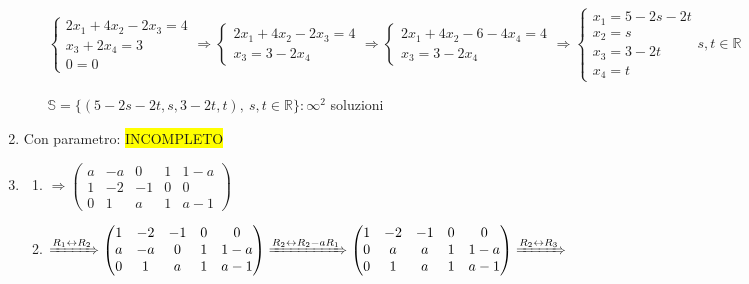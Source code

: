 \documentclass{article}
\newcommand{\hl}[1]{\colorbox{yellow}{#1}}
\newcommand{\R}{\mathbb{R}}
\begin{document}
\begin{enumerate}
\begin{enumerate}
		            $\begin{cases}
				            2x_1+4x_2-2x_3=4 \\
				            x_3+2x_4=3       \\
				            0=0
			            \end{cases}\Rightarrow
			            \begin{cases}
				            2x_1+4x_2-2x_3=4 \\
				            x_3=3-2x_4
			            \end{cases}\Rightarrow
			            \begin{cases}
				            2x_1+4x_2-6-4x_4=4 \\
				            x_3=3-2x_4
			            \end{cases}\Rightarrow
			            \begin{cases}
				            x_1=5-2s-2t \\
				            x_2=s       \\
				            x_3=3-2t    \\
				            x_4=t
			            \end{cases}s,t\in\R$

		            $\mathbb{S}=\{(5-2s-2t,s,3-2t,t),\ s,t\in\R\}:\infty^2$ soluzioni
	      \end{enumerate}
	\item Con parametro: \hl{INCOMPLETO}
	\item \begin{enumerate}
		      \item $\Rightarrow\begin{pmatrix}
				            a & -a & 0  & 1 & 1-a \\
				            1 & -2 & -1 & 0 & 0   \\
				            0 & 1  & a  & 1 & a-1
			            \end{pmatrix}$
		      \item $\xRightarrow{R_1\leftrightarrow R_2}
			            \begin{pmatrix}
				            1 & -2 & -1 & 0 & 0   \\
				            a & -a & 0  & 1 & 1-a \\
				            0 & 1  & a  & 1 & a-1
			            \end{pmatrix}\xRightarrow{R_2\leftrightarrow R_2-aR_1}
			            \begin{pmatrix}
				            1 & -2 & -1 & 0 & 0   \\
				            0 & a  & a  & 1 & 1-a \\
				            0 & 1  & a  & 1 & a-1
			            \end{pmatrix}\xRightarrow{R_2\leftrightarrow R_3}$


\end{enumerate}
\end{enumerate}
\end{document}
